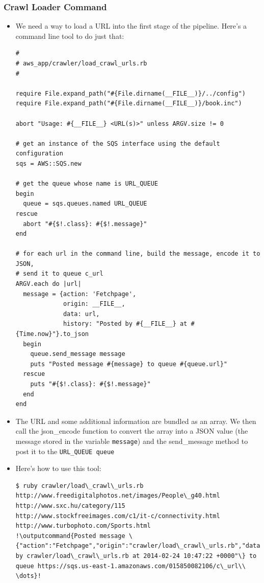 \documentclass{beamer}
\newcommand{\outputcommand}[1]{\color{darkgreen}{#1|}}
\begin{document}
\begin{frame}
\frametitle{Crawl Loader Command}

\begin{itemize}
\item We need a way to load a URL into the first stage of the pipeline. Here’s a command
line tool to do just that:
\lstset{language=Ruby, style=eclipse}
\begin{lstlisting}
#
# aws_app/crawler/load_crawl_urls.rb
#

require File.expand_path("#{File.dirname(__FILE__)}/../config")
require File.expand_path("#{File.dirname(__FILE__)}/book.inc")

abort "Usage: #{__FILE__} <URL(s)>" unless ARGV.size != 0

# get an instance of the SQS interface using the default configuration
sqs = AWS::SQS.new

# get the queue whose name is URL_QUEUE
begin
  queue = sqs.queues.named URL_QUEUE
rescue
  abort "#{$!.class}: #{$!.message}"
end

# for each url in the command line, build the message, encode it to JSON,
# send it to queue c_url
ARGV.each do |url|
  message = {action: 'Fetchpage',
             origin: __FILE__,
             data: url,
             history: "Posted by #{__FILE__} at #{Time.now}"}.to_json
  begin
    queue.send_message message
    puts "Posted message #{message} to queue #{queue.url}"
  rescue
    puts "#{$!.class}: #{$!.message}"
  end
end
\end{lstlisting}


\item The URL and some additional information are bundled as an array. We then call
the json\_encode function to convert the array into a JSON value (the message
stored in the variable \texttt{message}) and the send\_message method to post it to the
\texttt{URL\_QUEUE queue}

\item Here’s how to use this tool:
\lstset{language=shell}
\begin{lstlisting}[escapechar=!]
$ ruby crawler/load\_crawl\_urls.rb http://www.freedigitalphotos.net/images/People\_g40.html http://www.sxc.hu/category/115 http://www.stockfreeimages.com/c1/it-c/connectivity.html http://www.turbophoto.com/Sports.html
!\outputcommand{Posted message \{"action":"Fetchpage","origin":"crawler/load\_crawl\_urls.rb","data":"http://www.freedigitalphotos.net/images/People\_g40.html","history":"Posted by crawler/load\_crawl\_urls.rb at 2014-02-24 10:47:22 +0000"\} to queue https://sqs.us-east-1.amazonaws.com/015850082106/c\_url\\
\dots}!
\end{lstlisting}

\end{itemize}


\end{frame}
\end{document}
